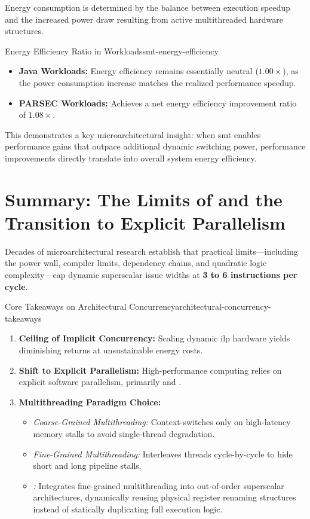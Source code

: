Energy consumption is determined by the balance between execution speedup and the increased power draw resulting from active multithreaded hardware structures.

\begin{concept}{Energy Efficiency Ratio in  Workloads}{smt-energy-efficiency}
    \begin{itemize}
        \item \textbf{Java Workloads:} Energy efficiency remains essentially neutral ($1.00\times$), as the power consumption increase matches the realized performance speedup.
        \item \textbf{PARSEC Workloads:} Achieves a net energy efficiency improvement ratio of $1.08\times$. 
    \end{itemize}
    This demonstrates a key microarchitectural insight: when \gls{smt} enables performance gains that outpace additional dynamic switching power, performance improvements directly translate into overall system energy efficiency.
\end{concept}

\section{Summary: The Limits of  and the Transition to Explicit Parallelism}
\label{sec:ilp_summary_shift_to_tlp}

Decades of microarchitectural research establish that practical limits—including the power wall, compiler limits, dependency chains, and quadratic logic complexity—cap dynamic superscalar issue widths at \textbf{3 to 6 instructions per cycle}.

\begin{concept}{Core Takeaways on Architectural Concurrency}{architectural-concurrency-takeaways}
    \begin{enumerate}
        \item \textbf{Ceiling of Implicit Concurrency:} Scaling dynamic \gls{ilp} hardware yields diminishing returns at unsustainable energy costs.
        \item \textbf{Shift to Explicit Parallelism:} High-performance computing relies on explicit software parallelism, primarily \textbf{} and \textbf{}.
        \item \textbf{Multithreading Paradigm Choice:} 
        \begin{itemize}
            \item \textit{Coarse-Grained Multithreading:} Context-switches only on high-latency memory stalls to avoid single-thread degradation.
            \item \textit{Fine-Grained Multithreading:} Interleaves threads cycle-by-cycle to hide short and long pipeline stalls.
            \item \textit{:} Integrates fine-grained multithreading into out-of-order superscalar architectures, dynamically reusing physical register renaming structures instead of statically duplicating full execution logic.
        \end{itemize}
    \end{enumerate}
\end{concept}